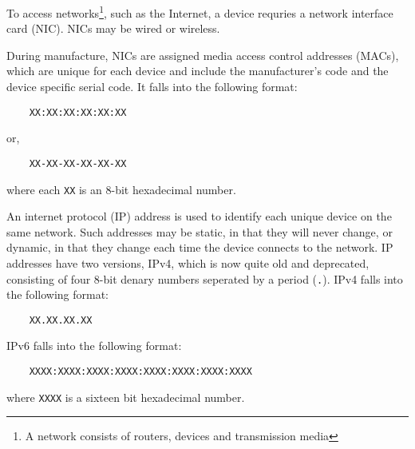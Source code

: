 To access networks\footnote{A network consists of routers, devices and transmission media},
such as the Internet, a device requries a network interface card (NIC). NICs may be wired or 
wireless.

During manufacture, NICs are assigned media access control addresses (MACs), which are unique for
each device and include the manufacturer's code and the device specific serial code. It falls into 
the
following format:
\begin{center}
	\begin{BVerbatim}
	XX:XX:XX:XX:XX:XX
	\end{BVerbatim}
\end{center}
or,
\begin{center}
	\begin{BVerbatim}
	XX-XX-XX-XX-XX-XX
	\end{BVerbatim}
\end{center}
where each \verb{XX{ is an 8-bit hexadecimal number.

An internet protocol (IP) address is used to identify each unique device on the same network. Such
addresses may be static, in that they will never change, or dynamic, in that they change each time
the device connects to the network. IP addresses have two versions, IPv4, which is now quite old
and deprecated, consisting of four 8-bit denary numbers seperated by a period (\verb{.{). IPv4
falls into the following format:
\begin{center}
	\begin{BVerbatim}
	XX.XX.XX.XX
	\end{BVerbatim}
\end{center}
IPv6 falls into the following format:
\begin{center}
	\begin{BVerbatim}
	XXXX:XXXX:XXXX:XXXX:XXXX:XXXX:XXXX:XXXX
	\end{BVerbatim}
\end{center}
where \verb{XXXX{ is a sixteen bit hexadecimal number.
